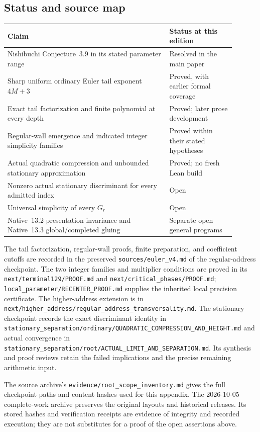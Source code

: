 \subsection{Status and source map}
\label{app:root:evidence}

\begin{center}
\begin{tabular}{>{\raggedright\arraybackslash}p{0.64\linewidth}>{\raggedright\arraybackslash}p{0.26\linewidth}}
\toprule
Claim & Status at this edition\\
\midrule
Nishibuchi Conjecture~3.9 in its stated parameter range
 & Resolved in the main paper\\
Sharp uniform ordinary Euler tail exponent $4M+3$
 & Proved, with earlier formal coverage\\
Exact tail factorization and finite polynomial at every depth
 & Proved; later prose development\\
Regular-wall emergence and indicated integer simplicity families
 & Proved within their stated hypotheses\\
Actual quadratic compression and unbounded stationary approximation
 & Proved; no fresh Lean build\\
Nonzero actual stationary discriminant for every admitted index
 & Open\\
Universal simplicity of every $G_r$
 & Open\\
Native~13.2 presentation invariance and Native~13.3 global/completed gluing
 & Separate open general programs\\
\bottomrule
\end{tabular}
\end{center}

The tail factorization, regular-wall proofs, finite preparation, and
coefficient cutoffs are recorded in the preserved
\nolinkurl{sources/euler_v4.md} of the regular-address checkpoint.
The two integer families and multiplier conditions are proved in its
\nolinkurl{next/terminal129/PROOF.md} and
\nolinkurl{next/critical_phases/PROOF.md};
\nolinkurl{local_parameter/RECENTER_PROOF.md} supplies the inherited
local precision certificate. The higher-address extension is in
\nolinkurl{next/higher_address/regular_address_transversality.md}.
The stationary checkpoint records the exact discriminant identity in
\nolinkurl{stationary_separation/ordinary/QUADRATIC_COMPRESSION_AND_HEIGHT.md}
and actual convergence in
\nolinkurl{stationary_separation/root/ACTUAL_LIMIT_AND_SEPARATION.md}.
Its synthesis and proof reviews retain the failed
implications and the precise remaining arithmetic input.

The source archive's \nolinkurl{evidence/root_scope_inventory.md} gives
the full checkpoint paths and content hashes used for this appendix.
The 2026-10-05 complete-work archive preserves the original layouts and
historical releases. Its stored hashes and verification receipts are
evidence of integrity and recorded execution; they are not substitutes
for a proof of the open assertions above.
